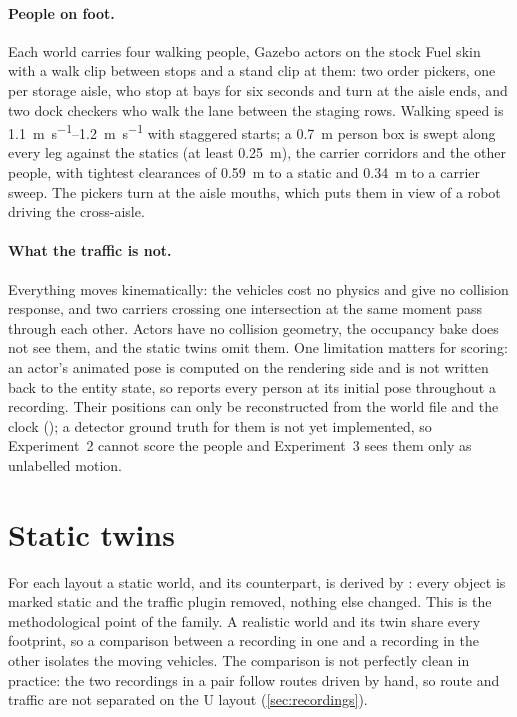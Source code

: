 \documentclass[11pt,a4paper,notitlepage]{report}
\begin{document}
\paragraph{People on foot.} Each world carries four walking people, Gazebo
actors on the stock Fuel skin with a walk clip between stops and a stand clip
at them: two order pickers, one per storage aisle, who stop at bays for six
seconds and turn at the aisle ends, and two dock checkers who walk the lane
between the staging rows. Walking speed is \SIrange{1.1}{1.2}{\metre\per\second}
with staggered starts; a \SI{0.7}{\metre} person box is swept along every leg
against the statics (at least \SI{0.25}{\metre}), the carrier corridors and
the other people, with tightest clearances of \SI{0.59}{\metre} to a static and
\SI{0.34}{\metre} to a carrier sweep. The pickers turn at the aisle mouths,
which puts them in view of a robot driving the cross-aisle.

\paragraph{What the traffic is not.} Everything moves kinematically: the
vehicles cost no physics and give no collision response, and two carriers
crossing one intersection at the same moment pass through each other. Actors
have no collision geometry, the occupancy bake does not see them, and the
static twins omit them. One limitation matters for scoring: an actor's
animated pose is computed on the rendering side and is not written back to
the entity state, so  reports every person at
its initial pose throughout a recording. Their positions can only be
reconstructed from the world file and the clock
(); a detector ground truth for them is not yet
implemented, so Experiment~2 cannot score the people and Experiment~3 sees
them only as unlabelled motion.

\section{Static twins}

For each layout a static world,
and its  counterpart, is derived by
: every object is marked static and the
traffic plugin removed, nothing else changed. This is the methodological point
of the family. A realistic world and its twin share every footprint, so a
comparison between a recording in one and a recording in the other isolates
the moving vehicles. The comparison is not perfectly clean in practice: the two
recordings in a pair follow routes driven by hand, so route and traffic are not
separated on the U layout (\cref{sec:recordings}).
\end{document}
